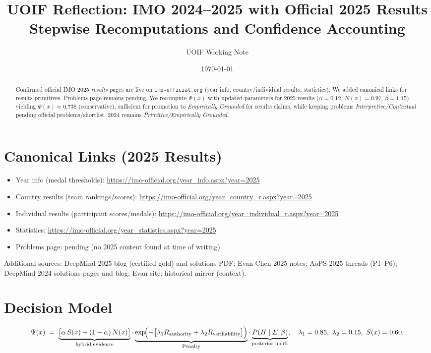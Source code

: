 \documentclass[11pt]{article}
\title{UOIF Reflection: IMO 2024--2025 with Official 2025 Results\\
Stepwise Recomputations and Confidence Accounting}
\author{UOIF Working Note}
\date{\today}
\newcommand{\Sx}{S(x)}
\newcommand{\Nx}{N(x)}
\newcommand{\Px}{\Psi(x)}
\newcommand{\post}{P(H\mid E,\beta)}
\newcommand{\pen}{\mathrm{Penalty}}
\begin{document}
\maketitle

\begin{abstract}
Confirmed official IMO 2025 \emph{results} pages are live on \texttt{imo-official.org} (year info, country/individual results, statistics). We added canonical links for results primitives. Problems page remains pending. We recompute $\Px$ with updated parameters for 2025 results ($\alpha=0.12$, $\Nx=0.97$, $\beta=1.15$) yielding $\Px\approx 0.738$ (conservative), sufficient for promotion to \emph{Empirically Grounded} for results claims, while keeping problems \emph{Interpretive/Contextual} pending official problems/shortlist. 2024 remains \emph{Primitive/Empirically Grounded}.
\end{abstract}

\section{Canonical Links (2025 Results)}
\begin{itemize}[leftmargin=1.35em]
  \item Year info (medal thresholds): \url{https://imo-official.org/year_info.aspx?year=2025}
  \item Country results (team rankings/scores): \url{https://imo-official.org/year_country_r.aspx?year=2025}
  \item Individual results (participant scores/medals): \url{https://imo-official.org/year_individual_r.aspx?year=2025}
  \item Statistics: \url{https://imo-official.org/year_statistics.aspx?year=2025}
  \item Problems page: pending (no 2025 content found at time of writing).
\end{itemize}
Additional sources: DeepMind 2025 blog (certified gold) and solutions PDF; Evan Chen 2025 notes; AoPS 2025 threads (P1--P6); DeepMind 2024 solutions pages and blog; Evan site; historical mirror (context).

\section{Decision Model}
\[
\Px \;=\; \underbrace{\bigl[\alpha\,\Sx + (1-\alpha)\,\Nx\bigr]}_{\text{hybrid evidence}}
\cdot
\underbrace{\exp\!\Bigl(-\bigl[\lambda_1 R_{\text{authority}}+\lambda_2 R_{\text{verifiability}}\bigr]\Bigr)}_{\pen}
\cdot
\underbrace{\post}_{\text{posterior uplift}},
\quad \lambda_1=0.85,\ \lambda_2=0.15,\ \Sx=0.60.
\]
\end{document}
